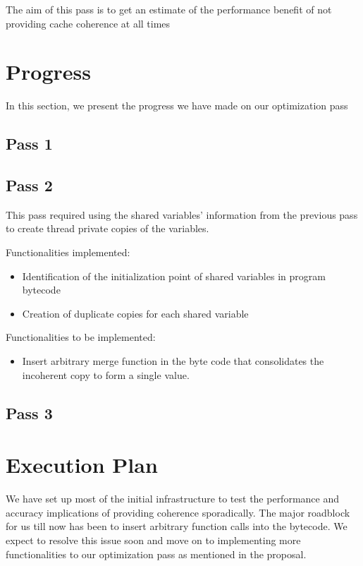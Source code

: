 \documentclass[12pt,conference]{IEEEtran}
\begin{document}
The aim of this pass is to get an estimate of the performance
benefit of not providing cache coherence at all times


\section{Progress}

In this section, we present the progress we have made on our 
optimization pass

\subsection{Pass 1}


\subsection{Pass 2}

This pass required using the shared variables' information from the previous pass 
to create thread private copies of the variables.

Functionalities implemented:
\begin{itemize}
\item Identification of the initialization point of shared variables in program bytecode
\item Creation of duplicate copies for each shared variable
\end{itemize}

Functionalities to be implemented:
\begin{itemize}
\item Insert arbitrary merge function in the byte code that consolidates the 
incoherent copy to form a single value.
\end{itemize}

\subsection{Pass 3}


\section{Execution Plan}

We have set up most of the initial infrastructure to test the performance and 
accuracy implications of providing coherence sporadically. The major roadblock
for us till now has been to insert arbitrary function calls into the bytecode.
We expect to resolve this issue soon and move on to implementing more 
functionalities to our optimization pass as mentioned in the proposal.
\end{document}
